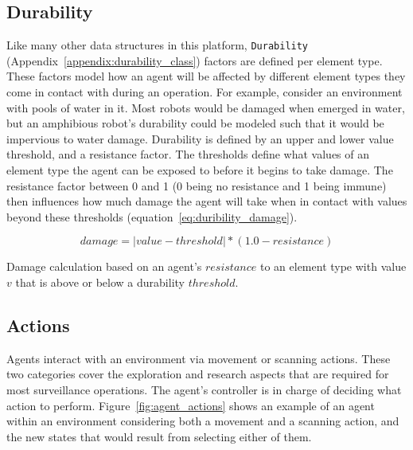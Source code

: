 \subsection{Durability} \label{subsec:durability}
Like many other data structures in this platform, \texttt{Durability} (Appendix~\ref{appendix:durability_class}) factors are defined per element type.
These factors model how an agent will be affected by different element types they come in contact with during an operation.
For example, consider an environment with pools of water in it.
Most robots would be damaged when emerged in water, but an amphibious robot's durability could be modeled such that it would be impervious to water damage.
Durability is defined by an upper and lower value threshold, and a resistance factor.
The thresholds define what values of an element type the agent can be exposed to before it begins to take damage.
The resistance factor between 0 and 1 (0 being no resistance and 1 being immune) then influences how much damage the agent will take when in contact with values beyond these thresholds (equation~\ref{eq:duribility_damage}).

\begin{capeq}[H]
  \begin{equation} \label{eq:duribility_damage}
    damage = |value - threshold| * (1.0 - resistance)
  \end{equation}
  \caption{Damage calculation based on an agent's $resistance$ to an element type with value $v$ that is above or below a durability $threshold$.}
\end{capeq}

\subsection{Actions} \label{subsec:actions}
Agents interact with an environment via movement or scanning actions.
These two categories cover the exploration and research aspects that are required for most surveillance operations.
The agent's controller is in charge of deciding what action to perform.
Figure~\ref{fig:agent_actions} shows an example of an agent within an environment considering both a movement and a scanning action, and the new states that would result from selecting either of them.

